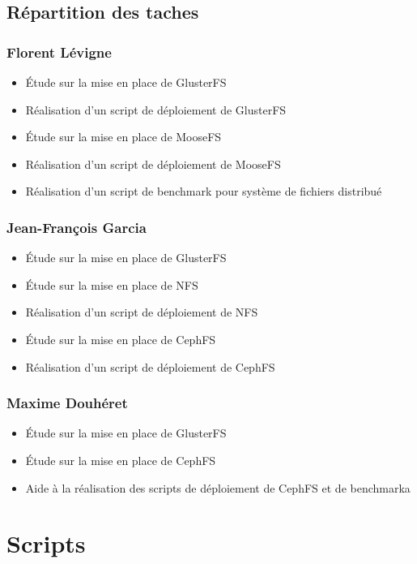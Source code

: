 \documentclass[12pt]{report}
\begin{document}
			\section{Répartition des taches}
				\subsection{Florent Lévigne}
					\begin{itemize}
						\item Étude sur la mise en place de GlusterFS
						\item Réalisation d'un script de déploiement de GlusterFS
						\item Étude sur la mise en place de MooseFS
						\item Réalisation d'un script de déploiement de MooseFS
						\item Réalisation d'un script de benchmark pour système de fichiers distribué
					\end{itemize}
				\subsection{Jean-François Garcia}
					\begin{itemize}
						\item Étude sur la mise en place de GlusterFS
						\item Étude sur la mise en place de NFS
						\item Réalisation d'un script de déploiement de NFS
						\item Étude sur la mise en place de CephFS
						\item Réalisation d'un script de déploiement de CephFS
					\end{itemize}
				\subsection{Maxime Douhéret}
					\begin{itemize}
						\item Étude sur la mise en place de GlusterFS
						\item Étude sur la mise en place de CephFS
						\item Aide à la réalisation des scripts de déploiement de CephFS et de benchmarka
					\end{itemize}
	
		\chapter{Scripts}
\end{document}
